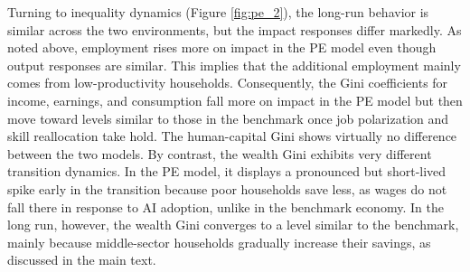 \documentclass[12pt]{article}
\begin{document}
Turning to inequality dynamics (Figure \ref{fig:pe_2}), the long-run behavior is similar across the two environments, but the impact responses differ markedly. As noted above, employment rises more on impact in the PE model even though output responses are similar. This implies that the additional employment mainly comes from low-productivity households. Consequently, the Gini coefficients for income, earnings, and consumption fall more on impact in the PE model but then move toward levels similar to those in the benchmark once job polarization and skill reallocation take hold. The human-capital Gini shows virtually no difference between the two models.  By contrast, the wealth Gini exhibits very different transition dynamics.  In the PE model, it displays a pronounced but short-lived spike early in the transition because poor households save less, as wages do not fall there in response to AI adoption, unlike in the benchmark economy.  In the long run, however, the wealth Gini converges to a level similar to the benchmark, mainly because middle-sector households gradually increase their savings, as discussed in the main text.

 
\end{document}
